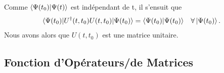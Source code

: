 \documentclass[../notesdecours.tex]{subfiles}
\begin{document}
\begin{Property} Comme $\braket{\Psi(t_0)|\Psi(t)}$ est indépendant de t, il s'ensuit que 
\begin{align}
\braket{\Psi(t_0)|U^\dag (t,t_0)U(t,t_0)|\Psi(t_0)} &= \braket{\Psi(t_0)|\Psi(t_0)}		&\forall\ket{\Psi(t_0)}.
\end{align}
Nous avons alors que $U(t,t_0)$ est une matrice unitaire. \end{Property}

\subsection{Fonction d'Opérateurs/de Matrices}
\end{document}
